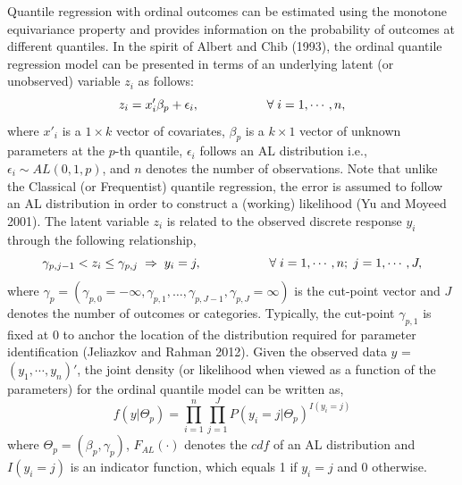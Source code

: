 Quantile regression with ordinal outcomes can be estimated using the monotone equivariance property and provides information on the probability of outcomes at different quantiles. In the spirit of Albert and Chib (1993), the ordinal quantile regression model can be presented in terms of an underlying latent (or unobserved) variable \(z_{i}\) as follows:
\begin{equation} 
z_{i} = x'_{i} \beta_{p} + \epsilon_{i}, \hspace{0.75in} \forall \; i=1, \cdots, n, 
\label{eq:latentreg} 
\end{equation}
where \(x'_{i}\) is a \(1 \times k\) vector of covariates, \(\beta_{p}\) is a \(k \times 1\) vector of unknown parameters at the \(p\)-th quantile, \(\epsilon_{i}\) follows an AL distribution i.e., \(\epsilon_{i} \sim AL(0,1,p)\), and \(n\) denotes the number of observations. Note that unlike the Classical (or Frequentist) quantile regression, the error is assumed to follow an AL distribution in order to construct a (working) likelihood (Yu and Moyeed 2001). The latent variable \(z_{i}\) is related to the observed discrete response \(y_{i}\) through the following relationship,
\begin{equation} 
\gamma_{p,j-1} < z_{i} \le \gamma_{p,j} \; \Rightarrow\; y_{i} = j, \hspace{0.75in} \forall \; i=1,\cdots, n; \; j=1,\cdots, J,
\label{eq:cutpoints} 
\end{equation}
where \(\gamma_{p} = (\gamma_{p,0}=-\infty, \gamma_{p,1},\ldots, \gamma_{p,J-1}, \gamma_{p,J}=\infty)\) is the cut-point vector and \(\textit{J}\) denotes the number of outcomes or categories. Typically, the cut-point \(\gamma_{p,1}\) is fixed at 0 to anchor the location of the distribution required for parameter identification (Jeliazkov and Rahman 2012). Given the observed data \(y\) = \((y_{1}, \cdots, y_{n})'\), the joint density (or likelihood when viewed as a function of the parameters) for the ordinal quantile model can be written as,
\begin{equation} 
f(y|\Theta_{p}) =  \prod_{i=1}^{n} \prod_{j=1}^{J} P(y_{i} = j | \Theta_{p})^{ I(y_{i} = j)}  %
\label{eq:likelihood}
\end{equation}
where \(\Theta_{p} = (\beta_{p}, \gamma_{p})\), \(F_{AL}(\cdot)\) denotes the \({cdf}\) of an AL distribution and \(I(y_{i}=j)\) is an indicator function, which equals 1 if \(y_{i}=j\) and 0 otherwise.

